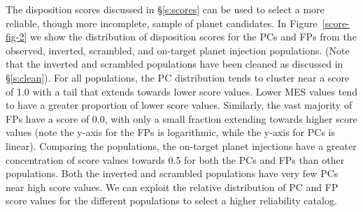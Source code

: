 The disposition scores discussed in \S\ref{s:scores} can be used to select a more reliable, though more incomplete, sample of planet candidates. In Figure~\ref{score-fig-2} we show the distribution of disposition scores for the PCs and FPs from the observed, inverted, scrambled, and on-target planet injection populations. (Note that the inverted and scrambled populations have been cleaned as discussed in \S\ref{s:clean}). For all populations, the PC distribution tends to cluster near a score of 1.0 with a tail that extends towards lower score values. Lower MES values tend to have a greater proportion of lower score values. Similarly, the vast majority of FPs have a score of 0.0, with only a small fraction extending towards higher score values (note the y-axis for the FPs is logarithmic, while the y-axis for PCs is linear). Comparing the populations, the on-target planet injections have a greater concentration of score values towards 0.5 for both the PCs and FPs than other populations. Both the inverted and scrambled populations have very few PCs near high score values. We can exploit the relative distribution of PC and FP score values for the different populations to select a higher reliability catalog.


